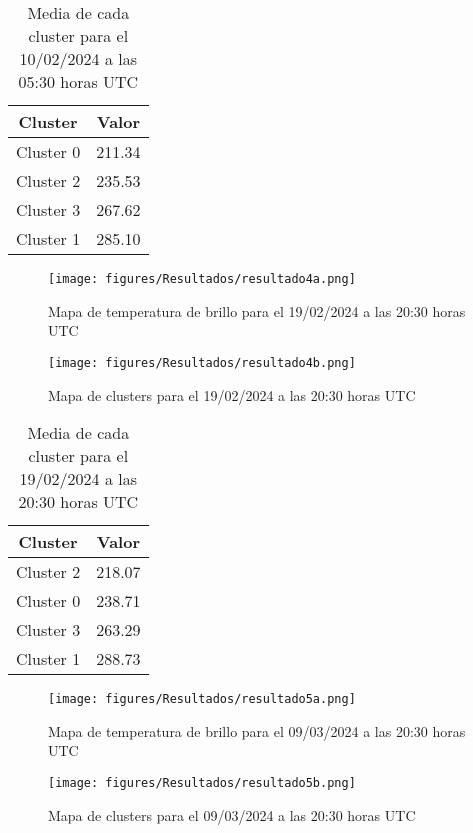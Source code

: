 \documentclass[twocolumn]{IECEjournal} %
\begin{document}
\begin{table}[h!]
    \centering
    \label{tab7}
    \begin{tabular}{|c|c|}
    \hline
    \textbf{Cluster} & \textbf{Valor} \\
    \hline
    Cluster 0 & 211.34 \\
    Cluster 2 & 235.53 \\
    Cluster 3 & 267.62 \\
    Cluster 1 & 285.10 \\
    \hline
    \end{tabular}
    \caption{Media de cada cluster para el 10/02/2024 a las 05:30 horas UTC}
\end{table}

\begin{figure}[H]
	\centering
	\texttt{[image: figures/Resultados/resultado4a.png]}
	\caption{Mapa de temperatura de brillo para el 19/02/2024 a las 20:30 horas UTC}
	\label{fig12}
\end{figure}

\begin{figure}[H]
	\centering
	\texttt{[image: figures/Resultados/resultado4b.png]}
	\caption{Mapa de clusters para el 19/02/2024 a las 20:30 horas UTC}
	\label{fig13}
\end{figure}

\begin{table}[h!]
    \centering
    \label{tab8}
    \begin{tabular}{|c|c|}
    \hline
    \textbf{Cluster} & \textbf{Valor} \\
    \hline
    Cluster 2 & 218.07 \\
    Cluster 0 & 238.71 \\
    Cluster 3 & 263.29 \\
    Cluster 1 & 288.73 \\
    \hline
    \end{tabular}
    \caption{Media de cada cluster para el 19/02/2024 a las 20:30 horas UTC}
\end{table}

\begin{figure}[H]
	\centering
	\texttt{[image: figures/Resultados/resultado5a.png]}
	\caption{Mapa de temperatura de brillo para el 09/03/2024 a las 20:30 horas UTC}
	\label{fig14}
\end{figure}

\begin{figure}[H]
	\centering
	\texttt{[image: figures/Resultados/resultado5b.png]}
	\caption{Mapa de clusters para el 09/03/2024 a las 20:30 horas UTC}
	\label{fig15}
\end{figure}
\end{document}
